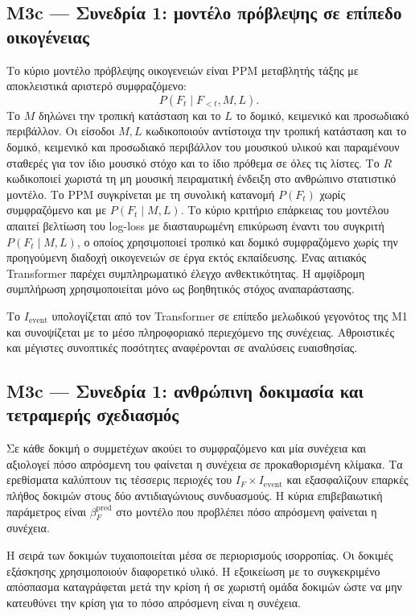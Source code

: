 \documentclass[11pt,a4paper]{article}
\begin{document}
\subsection{M3c — Συνεδρία 1: μοντέλο πρόβλεψης σε επίπεδο οικογένειας}\label{app:human-m3c-model}

Το κύριο μοντέλο πρόβλεψης οικογενειών είναι PPM μεταβλητής τάξης με αποκλειστικά αριστερό συμφραζόμενο:
\[
P(F_t\mid F_{<t},M,L).
\]
Το $M$ δηλώνει την τροπική κατάσταση και το $L$ το δομικό, κειμενικό και προσωδιακό περιβάλλον. Οι είσοδοι $M,L$ κωδικοποιούν αντίστοιχα την τροπική κατάσταση και το δομικό, κειμενικό και προσωδιακό περιβάλλον του μουσικού υλικού και παραμένουν σταθερές για τον ίδιο μουσικό στόχο και το ίδιο πρόθεμα σε όλες τις λίστες. Το $R$ κωδικοποιεί χωριστά τη μη μουσική πειραματική ένδειξη στο ανθρώπινο στατιστικό μοντέλο. Το PPM συγκρίνεται με τη συνολική κατανομή $P(F_t)$ χωρίς συμφραζόμενο και με $P(F_t\mid M,L)$. Το κύριο κριτήριο επάρκειας του μοντέλου απαιτεί βελτίωση του log-loss με διασταυρωμένη επικύρωση έναντι του συγκριτή $P(F_t\mid M,L)$, ο οποίος χρησιμοποιεί τροπικό και δομικό συμφραζόμενο χωρίς την προηγούμενη διαδοχή οικογενειών σε έργα εκτός εκπαίδευσης. Ένας αιτιακός Transformer παρέχει συμπληρωματικό έλεγχο ανθεκτικότητας. Η αμφίδρομη συμπλήρωση χρησιμοποιείται μόνο ως βοηθητικός στόχος αναπαράστασης.

Το $I_{\mathrm{event}}$ υπολογίζεται από τον Transformer σε επίπεδο μελωδικού γεγονότος της M1 και συνοψίζεται με το μέσο πληροφοριακό περιεχόμενο της συνέχειας. Αθροιστικές και μέγιστες συνοπτικές ποσότητες αναφέρονται σε αναλύσεις ευαισθησίας.

\subsection{M3c — Συνεδρία 1: ανθρώπινη δοκιμασία και τετραμερής σχεδιασμός}\label{app:human-m3c-task}

Σε κάθε δοκιμή ο συμμετέχων ακούει το συμφραζόμενο και μία συνέχεια και αξιολογεί πόσο απρόσμενη του φαίνεται η συνέχεια σε προκαθορισμένη κλίμακα. Τα ερεθίσματα καλύπτουν τις τέσσερις περιοχές του $I_F\times I_{\mathrm{event}}$ και εξασφαλίζουν επαρκές πλήθος δοκιμών στους δύο αντιδιαγώνιους συνδυασμούς. Η κύρια επιβεβαιωτική παράμετρος είναι $\beta_F^{\mathrm{pred}}$ στο μοντέλο που προβλέπει πόσο απρόσμενη φαίνεται η συνέχεια.

Η σειρά των δοκιμών τυχαιοποιείται μέσα σε περιορισμούς ισορροπίας. Οι δοκιμές εξάσκησης χρησιμοποιούν διαφορετικό υλικό. Η εξοικείωση με το συγκεκριμένο απόσπασμα καταγράφεται μετά την κρίση ή σε χωριστή ομάδα δοκιμών ώστε να μην κατευθύνει την κρίση για το πόσο απρόσμενη είναι η συνέχεια.
\end{document}
